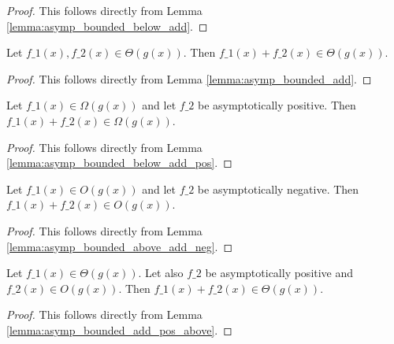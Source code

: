 \begin{proof}
    \leanok
    This follows directly from Lemma \ref{lemma:asymp_bounded_below_add}.
\end{proof}

\begin{lemma}
    \label{lemma:theta_add}
    \leanok
    Let $f\_1(x), f\_2(x) \in \Theta(g(x))$. Then $f\_1(x) + f\_2(x) \in \Theta(g(x))$.
\end{lemma}

\begin{proof}
    \leanok
    This follows directly from Lemma \ref{lemma:asymp_bounded_add}.
\end{proof}

\begin{lemma}
    \label{lemma:big_omega_add_pos}
    \leanok
    Let $f\_1(x) \in \Omega(g(x))$ and let $f\_2$ be asymptotically positive. 
    Then $f\_1(x) + f\_2(x) \in \Omega(g(x))$.
\end{lemma}

\begin{proof}
    \leanok
    This follows directly from Lemma \ref{lemma:asymp_bounded_below_add_pos}.
\end{proof}

\begin{lemma}
    \label{lemma:big_o_add_neg}
    \leanok
    Let $f\_1(x) \in O(g(x))$ and let $f\_2$ be asymptotically negative. 
    Then $f\_1(x) + f\_2(x) \in O(g(x))$.
\end{lemma}

\begin{proof}
    \leanok
    This follows directly from Lemma \ref{lemma:asymp_bounded_above_add_neg}.
\end{proof}

\begin{lemma}
    \label{lemma:theta_add_pos_O}
    \leanok
    Let $f\_1(x) \in \Theta(g(x))$. Let also $f\_2$ be asymptotically positive and
    $f\_2(x) \in O(g(x))$. Then $f\_1(x) + f\_2(x) \in \Theta(g(x))$.
\end{lemma}

\begin{proof}
    \leanok
    This follows directly from Lemma \ref{lemma:asymp_bounded_add_pos_above}.
\end{proof}

